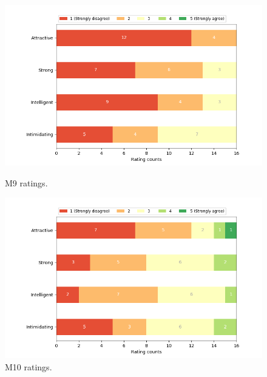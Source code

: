 \begin{figure}[H]
  \includegraphics[width=\linewidth]{Survey/MRatings/avatar_m9.png}
  \caption{M9 ratings.}
\endminipage\hfill
{}
  \includegraphics[width=\linewidth]{Survey/MRatings/avatar_m10.png}
  \caption{M10 ratings.}
\endminipage\hfill
\end{figure}
